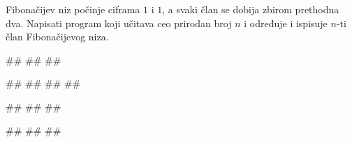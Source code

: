 \begin{Exercise}[label=1.3_31] 
Fibonačijev niz počinje ciframa $1$ i $1$, a svaki član se dobija
zbirom prethodna dva. Napisati program koji učitava ceo prirodan broj
$n$ i određuje i ispisuje $n$-ti član Fibonačijevog niza.

\begin{miditest}
\begin{upotreba}{1}
#\naslovInt#
##
##
\end{upotreba}
\end{miditest}
\begin{miditest}
\begin{upotreba}{2}
#\naslovInt#
##
##
##
\end{upotreba}
\end{miditest}

\begin{miditest}
\begin{upotreba}{3}
#\naslovInt#
##
##
\end{upotreba}
\end{miditest}
\begin{miditest}
\begin{upotreba}{4}
#\naslovInt#
##
##
\end{upotreba}
\end{miditest}
\end{Exercise}
\begin{Answer}[ref=1.3_31]
\end{Answer}


